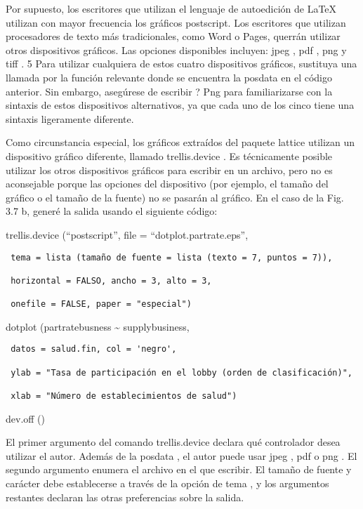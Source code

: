 \documentclass[
]{book}
\begin{document}
Por supuesto, los escritores que utilizan el lenguaje de autoedición de LaTeX utilizan con mayor frecuencia los gráficos postscript. Los escritores que utilizan procesadores de texto más tradicionales, como Word o Pages, querrán utilizar otros dispositivos gráficos. Las opciones disponibles incluyen: jpeg , pdf , png y tiff . 5 Para utilizar cualquiera de estos cuatro dispositivos gráficos, sustituya una llamada por la función relevante donde se encuentra la posdata en el código anterior. Sin embargo, asegúrese de escribir ? Png para familiarizarse con la sintaxis de estos dispositivos alternativos, ya que cada uno de los cinco tiene una sintaxis ligeramente diferente.

Como circunstancia especial, los gráficos extraídos del paquete lattice utilizan un dispositivo gráfico diferente, llamado trellis.device . Es técnicamente posible utilizar los otros dispositivos gráficos para escribir en un archivo, pero no es aconsejable porque las opciones del dispositivo (por ejemplo, el tamaño del gráfico o el tamaño de la fuente) no se pasarán al gráfico. En el caso de la Fig.  3.7 b, generé la salida usando el siguiente código:

trellis.device (``postscript'', file = ``dotplot.partrate.eps'',

\begin{verbatim}
 tema = lista (tamaño de fuente = lista (texto = 7, puntos = 7)),

 horizontal = FALSO, ancho = 3, alto = 3,

 onefile = FALSE, paper = "especial")
\end{verbatim}

dotplot (partratebusness \textasciitilde{} supplybusiness,

\begin{verbatim}
 datos = salud.fin, col = 'negro',

 ylab = "Tasa de participación en el lobby (orden de clasificación)",

 xlab = "Número de establecimientos de salud")
\end{verbatim}

dev.off ()

El primer argumento del comando trellis.device declara qué controlador desea utilizar el autor. Además de la posdata , el autor puede usar jpeg , pdf o png . El segundo argumento enumera el archivo en el que escribir. El tamaño de fuente y carácter debe establecerse a través de la opción de tema , y los argumentos restantes declaran las otras preferencias sobre la salida.
\end{document}
